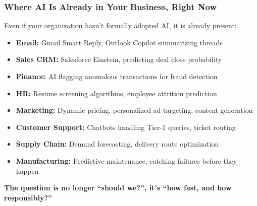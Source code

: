\begin{frame}[fragile]\frametitle{Where AI Is Already in Your Business, Right Now}

Even if your organization hasn't formally adopted AI, it is already present:
\begin{itemize}
  \item \textbf{Email:} Gmail Smart Reply, Outlook Copilot summarizing threads
  \item \textbf{Sales CRM:} Salesforce Einstein, predicting deal close probability
  \item \textbf{Finance:} AI flagging anomalous transactions for fraud detection
  \item \textbf{HR:} Resume screening algorithms, employee attrition prediction
  \item \textbf{Marketing:} Dynamic pricing, personalized ad targeting, content generation
  \item \textbf{Customer Support:} Chatbots handling Tier-1 queries, ticket routing
  \item \textbf{Supply Chain:} Demand forecasting, delivery route optimization
  \item \textbf{Manufacturing:} Predictive maintenance, catching failures before they happen
\end{itemize}

\textbf{The question is no longer ``should we?'', it's ``how fast, and how responsibly?''}

\end{frame}

